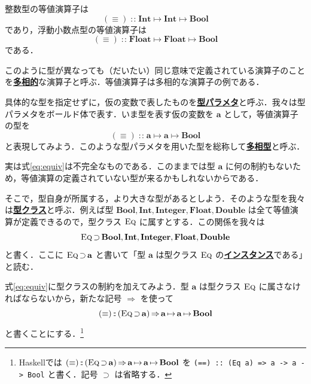 \documentclass[a4paper,twocolumn]{jsbook}
\newcommand{\programminglanguage}[1]{\textsf{#1}}
\newcommand{\cxx}{\programminglanguage{C}\texttt{++}}
\newcommand{\haskell}{\programminglanguage{Haskell}}
\newcommand{\java}{\programminglanguage{Java}}
\newcommand{\keyword}[1]{{\underline{\textbf{#1}}}}
\newcommand{\code}[1]{\texttt{#1}}
\DeclareMathOperator{\mSuperClass}{\Rightarrow}
\DeclareMathOperator{\mSuperSet}{\supset}
\DeclareMathOperator{\mIn}{{:\!:}}
\DeclareMathOperator{\mMapsTo}{\mapsto}
\newcommand{\mType}[1]{\mathbf{#1}}
\newcommand{\mBoolType}{\mType{Bool}}
\newcommand{\mFloatType}{\mType{Float}}
\newcommand{\mDoubleType}{\mType{Double}}
\newcommand{\mIntType}{\mType{Int}}
\newcommand{\mIntegerType}{\mType{Integer}}
\newcommand{\mGenericTypeClass}[1]{\textsc{#1}} %
\newcommand{\mEqTypeClass}{\mGenericTypeClass{Eq}}
\newcommand{\mProj}[2]{#1\mMapsTo#2}
\begin{document}
整数型の等値演算子は
\begin{equation}
(\equiv)\mIn\mProj{\mProj{\mIntType}{\mIntType}}{\mBoolType}
\end{equation}
であり，浮動小数点型の等値演算子は
\begin{equation}
(\equiv)\mIn\mProj{\mProj{\mFloatType}{\mFloatType}}{\mBoolType}
\end{equation}
である．

このように型が異なっても（だいたい）同じ意味で定義されている演算子のことを\keyword{多相的}な演算子と呼ぶ．等値演算子は多相的な演算子の例である．


具体的な型を指定せずに，仮の変数で表したものを\keyword{型パラメタ}と呼ぶ．我々は型パラメタをボールド体で表す．いま型を表す仮の変数を $\mType{a}$ として，等値演算子の型を
\begin{equation}
\label{eq:equiv}
(\equiv)\mIn\mProj{\mProj{\mType{a}}{\mType{a}}}{\mBoolType}
\end{equation}
と表現してみよう．このような型パラメタを用いた型を総称して\keyword{多相型}と呼ぶ．

実は式\eqref{eq:equiv}は不完全なものである．このままでは型 $\mType{a}$ に何の制約もないため，等値演算の定義されていない型が来るかもしれないからである．

そこで，型自身が所属する，より大きな型があるとしよう．そのような型を我々は\keyword{型クラス}と呼ぶ．例えば型 $\mBoolType,\mIntType,\mIntegerType,\mFloatType,\mDoubleType$ は全て等値演算が定義できるので，型クラス $\mEqTypeClass$ に属すとする．この関係を我々は
\begin{equation}
\mEqTypeClass\mSuperSet\mBoolType,\mIntType,\mIntegerType,\mFloatType,\mDoubleType
\end{equation}
と書く．ここに $\mEqTypeClass\mSuperSet\mType{a}$ と書いて「型 $\mType{a}$ は型クラス $\mEqTypeClass$ の\keyword{インスタンス}である」と読む．

式\eqref{eq:equiv}に型クラスの制約を加えてみよう．型 $\mType{a}$ は型クラス $\mEqTypeClass$ に属さなければならないから，新たな記号 $\mSuperClass$ を使って
\begin{equation}
(\equiv)\mIn{}(\mEqTypeClass\mSuperSet\mType{a})\mSuperClass\mProj{\mProj{\mType{a}}{\mType{a}}}{\mBoolType}
\end{equation}
と書くことにする．\footnote{\haskell では $(\equiv)\mIn{}(\mEqTypeClass\mSuperSet\mType{a})\mSuperClass\mProj{\mProj{\mType{a}}{\mType{a}}}{\mBoolType}$ を \code{(==) :: (Eq a) => a -> a -> Bool} と書く．記号 $\mSuperSet$ は省略する．}
\end{document}
